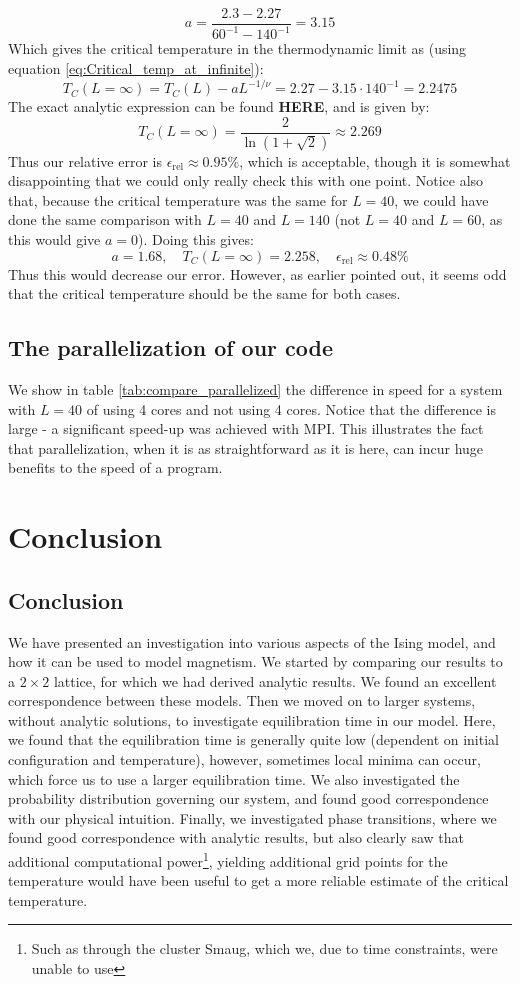 \documentclass[a4paper, 10pt]{article}
\begin{document}
$$a=\frac{2.3-2.27}{60^{-1}-140^{-1}}=3.15$$
Which gives the critical temperature in the thermodynamic limit as (using equation \ref{eq:Critical_temp_at_infinite}):
$$T_C(L=\infty)=T_C(L)-aL^{-1/\nu}=2.27-3.15\cdot 140^{-1}=2.2475$$
The exact analytic expression can be found \textbf{HERE}, and is given by:
$$T_C(L=\infty)=\frac{2}{\ln(1+\sqrt{2})}\approx2.269$$
Thus our relative error is $\epsilon_{\mathrm{rel}}\approx 0.95 \%$, which is acceptable, though it is somewhat disappointing that we could only really check this with one point. Notice also that, because the critical temperature was the same for $L=40$, we could have done the same comparison with $L=40$ and $L=140$ (not $L=40$ and $L=60$, as this would give $a=0$). Doing this gives:
$$a=1.68, \quad T_C(L=\infty)=2.258, \quad \epsilon_{\mathrm{rel}}\approx 0.48 \%$$
Thus this would decrease our error. However, as earlier pointed out, it seems odd that the critical temperature should be the same for both cases.
\subsection{The parallelization of our code}
We show in table \ref{tab:compare_parallelized} the difference in speed for a system with $L=40$ of using 4 cores and not using 4 cores. Notice that the difference is large - a significant speed-up was achieved with MPI. This illustrates the fact that parallelization, when it is as straightforward as it is here, can incur huge benefits to the speed of a program.
\section{Conclusion}
\subsection{Conclusion}
We have presented an investigation into various aspects of the Ising model, and how it can be used to model magnetism. We started by comparing our results to a $2\times 2$ lattice, for which we had derived analytic results. We found an excellent correspondence between these models. Then we moved on to larger systems, without analytic solutions, to investigate equilibration time in our model. Here, we found that the equilibration time is generally quite low (dependent on initial configuration and temperature), however, sometimes local minima can occur, which force us to use a larger equilibration time. We also investigated the probability distribution governing our system, and found good correspondence with our physical intuition. Finally, we investigated phase transitions, where we found good correspondence with analytic results, but also clearly saw that additional computational power\footnote{Such as through the cluster Smaug, which we, due to time constraints, were unable to use}, yielding additional grid points for the temperature would have been useful to get a more reliable estimate of the critical temperature.
\end{document}
